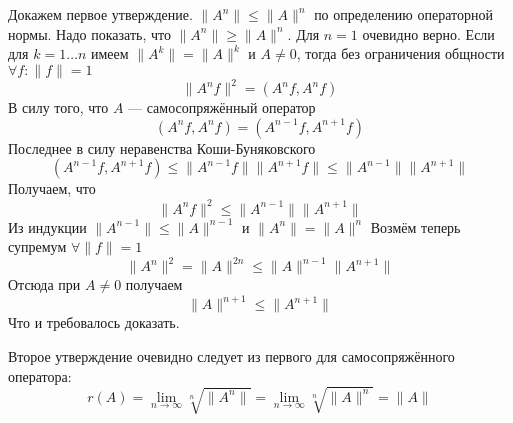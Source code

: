 \documentclass[14pt]{extarticle}
\begin{document}
\begin{Proof}
    Докажем первое утверждение.
    $\|A^n\| \le \|A\|^n$ по определению операторной нормы.
    Надо показать, что $\|A^n\| \ge \|A\|^n$.
    Для $n = 1$ очевидно верно.
    Если для $k = 1 \dots n$ имеем $\|A^k\| = \|A\|^k$ и $A \ne 0$, тогда 
    без ограничения общности $\forall f: \|f\| = 1$
    $$
    \|A^n f\|^2 = (A^n f, A^n f)
    $$
    В силу того, что $A$ --- самосопряжённый оператор
    $$
    (A^n f, A^n f) = (A^{n - 1} f, A^{n + 1} f)
    $$
    Последнее в силу неравенства Коши-Буняковского
    $$
    (A^{n - 1} f, A^{n + 1} f) \le \|A^{n - 1}f\| \|A^{n + 1} f\| 
    \le \|A^{n - 1}\| \|A^{n + 1}\|
    $$
    Получаем, что
    $$
    \|A^n f\|^2 \le \|A^{n - 1}\| \|A^{n + 1}\|
    $$
    Из индукции $\|A^{n - 1}\| \le \|A\|^{n -1}$ и $\|A^n\| = \|A\|^n$
    Возмём теперь супремум $\forall \|f\| = 1$
    $$
    \|A^n\|^2 = \|A\|^{2n} \le \|A\|^{n - 1} \|A^{n + 1}\|
    $$
    Отсюда при $A \ne 0$ получаем
    $$
    \|A\|^{n + 1} \le \|A^{n + 1}\|
    $$
    Что и требовалось доказать.

    Второе утверждение очевидно следует из первого для самосопряжённого
    оператора:
    $$
    r(A) = \lim_{n \to \infty} \sqrt[n]{\|A^n\|} = \lim_{n \to \infty}
    \sqrt[n]{\|A\|^n} = \|A\|
    $$


\end{Proof}
\end{document}
